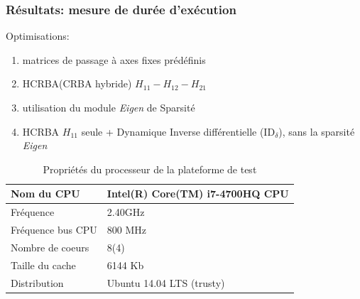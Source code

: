 \documentclass[10pt]{beamer}
\begin{document}
\begin{frame}\scriptsize
  \frametitle{Résultats: mesure de durée d'exécution}

  Optimisations:
	\begin{enumerate}
	\item matrices de passage à axes fixes prédéfinis
	\item HCRBA(CRBA hybride) $H_{11}-H_{12}-H_{21}$
	\item utilisation du module \emph{Eigen} de Sparsité
	\item HCRBA $H_{11}$ seule + Dynamique Inverse différentielle ($\mathrm{ID}_\delta$), sans la sparsité \emph{Eigen}
	\end{enumerate}
	
	
	\begin{flushleft}
	
	\begin{table}[H]
	\begin{center}
	\begin{tabular}[H]{|l|l|}
	\hline
	Nom du CPU & Intel(R) Core(TM) i7-4700HQ CPU \\ \hline \hline
	Fréquence & 2.40GHz \\ \hline
	Fréquence bus CPU & 800 MHz \\ \hline
	Nombre de coeurs & 8(4) \\ \hline
	Taille du cache & 6144 Kb \\ \hline
	Distribution & Ubuntu 14.04 LTS (trusty) \\
	\hline
	\end{tabular}
	\caption[Table caption text]{Propriétés du processeur de la plateforme de test}
	\label{table:propriétésProc}
	\end{center}
	\end{table}
	
	\end{flushleft}
	
\end{frame}
\end{document}
